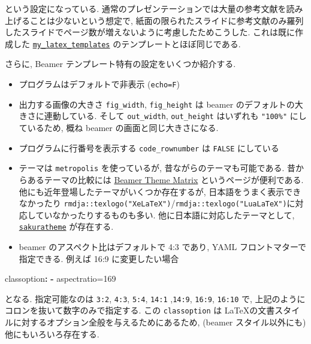 \documentclass[
]{bxjsbook}
\newenvironment{Shaded}{\begin{snugshade}}{\end{snugshade}}
\newcommand{\AttributeTok}[1]{\textcolor[rgb]{0.77,0.63,0.00}{#1}}
\newcommand{\FunctionTok}[1]{\textcolor[rgb]{0.00,0.00,0.00}{#1}}
\newcommand{\KeywordTok}[1]{\textcolor[rgb]{0.13,0.29,0.53}{\textbf{#1}}}
\providecommand{\tightlist}{%
  \setlength{\itemsep}{0pt}\setlength{\parskip}{0pt}}
\theoremstyle{definition}
\theoremstyle{definition}
\theoremstyle{definition}
\theoremstyle{remark}
\begin{document}
という設定になっている.
通常のプレゼンテーションでは大量の参考文献を読み上げることは少ないという想定で,
紙面の限られたスライドに参考文献のみ羅列したスライドでページ数が増えないように考慮したためこうした.
これは既に作成した
\href{https://github.com/Gedevan-Aleksizde/my_latex_templates}{\texttt{my\_latex\_templates}}
のテンプレートとほぼ同じである.

さらに, Beamer テンプレート特有の設定をいくつか紹介する.

\begin{itemize}
\tightlist
\item
  プログラムはデフォルトで非表示 (\texttt{echo=F})
\item
  出力する画像の大きさ \texttt{fig\_width}, \texttt{fig\_height} は
  beamer のデフォルトの大きさに連動している. そして \texttt{out\_width},
  \texttt{out\_height} はいずれも \texttt{"100\%"} にしているため, 概ね
  beamer の画面と同じ大きさになる.
\item
  プログラムに行番号を表示する \texttt{code\_rownumber} は
  \texttt{FALSE} にしている
\item
  テーマは \texttt{metropolis} を使っているが,
  昔ながらのテーマも可能である. 昔からあるテーマの比較には
  \href{https://hartwork.org/beamer-theme-matrix/}{Beamer Theme Matrix}
  というページが便利である.
  他にも近年登場したテーマがいくつか存在するが,
  日本語をうまく表示できなかったり
  \texttt{rmdja::texlogo("XeLaTeX")}/\texttt{rmdja::texlogo("LuaLaTeX")}に対応していなかったりするものも多い.
  他に日本語に対応したテーマとして,
  \href{https://github.com/pecorarista/sakuratheme}{\texttt{sakuratheme}}
  が存在する.
\item
  beamer のアスペクト比はデフォルトで 4:3 であり, YAML
  フロントマターで指定できる. 例えば 16:9 に変更したい場合
\end{itemize}

\begin{Shaded}
\begin{Highlighting}[]
\FunctionTok{classoption}\KeywordTok{:}
\AttributeTok{  }\KeywordTok{{-}}\AttributeTok{ aspectratio=169}
\end{Highlighting}
\end{Shaded}

となる. 指定可能なのは \texttt{3:2}, \texttt{4:3}, \texttt{5:4},
\texttt{14:1} ,\texttt{14:9}, \texttt{16:9}, \texttt{16:10} で,
上記のようにコロンを抜いて数字のみで指定する. この \texttt{classoption}
は \LaTeX の文書スタイルに対するオプション全般を与えるためにあるため,
(beamer スタイル以外にも) 他にもいろいろ存在する.
\end{document}
